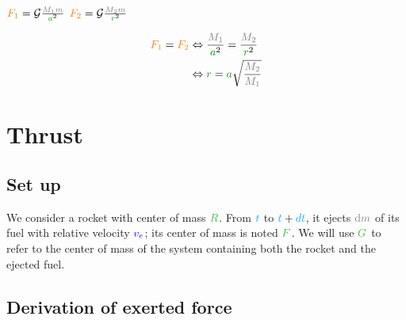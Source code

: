 $\force{F_1} = \mathcal G \frac {\mass{M_1} \mass{m}} {\dist{a}^2}$
$\force{F_2} = \mathcal G \frac {\mass{M_2} \mass{m}} {\dist{r}^2}$

\begin{align*}
\force{F_1} = \force{F_2}
& \Leftrightarrow \frac {\mass{M_1}} {\dist{a}^2} = \frac {\mass{M_2}} {\dist{r}^2} \\
& \Leftrightarrow \dist{r} = \dist{a} \sqrt{\frac {\mass{M_2}} {\mass{M_1}}} \\
\end{align*}



\section{Thrust}


\subsection{Set up}

We consider a rocket with center of mass $\posit{R}$. From $\textcolor{cyan}{t}$ to
$\textcolor{cyan}{t}+\textcolor{cyan}{dt}$, it ejects $\mass{\dm}$ of its fuel with relative
velocity $\textcolor{blue}{v_e}$; its center of mass is noted $\posit{F}$. We will
use $\posit{G}$ to refer to the center of mass of the system containing
both the rocket and the ejected fuel.


\subsection{Derivation of exerted force}

